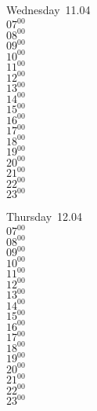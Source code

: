 \documentclass[11pt, a4paper]{book}\usepackage[]{graphicx}\usepackage[]{color}
\begin{document}
\begin{weekdaybox}
  Wednesday~11.04\\
  { 
  \vfill
  $07^{00}$\\
$08^{00}$\\
$09^{00}$\\
$10^{00}$\\
$11^{00}$\\
$12^{00}$\\
$13^{00}$\\
$14^{00}$\\
$15^{00}$\\
$16^{00}$\\
$17^{00}$\\
$18^{00}$\\
$19^{00}$\\
$20^{00}$\\
$21^{00}$\\
$22^{00}$\\
$23^{00}$\\
  }
\end{weekdaybox}
\clearpage
\begin{headerbox}
\end{headerbox}
\begin{weekdaybox}
  Thursday~12.04\\
  { 
  \vfill
  $07^{00}$\\
$08^{00}$\\
$09^{00}$\\
$10^{00}$\\
$11^{00}$\\
$12^{00}$\\
$13^{00}$\\
$14^{00}$\\
$15^{00}$\\
$16^{00}$\\
$17^{00}$\\
$18^{00}$\\
$19^{00}$\\
$20^{00}$\\
$21^{00}$\\
$22^{00}$\\
$23^{00}$\\
  }
\end{weekdaybox} 
\end{document}
